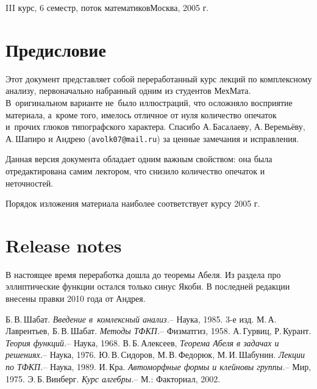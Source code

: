 \documentclass[a4paper]{article}
\begin{document}
{III курс, 6 семестр, поток математиков}{Москва, 2005 г.}

\pagebreak
\tableofcontents

\pagebreak

\section*{Предисловие}

Этот документ представляет собой переработанный курс лекций по комплексному анализу, первоначально набранный
одним из студентов МехМата. В~оригинальном варианте не~было иллюстраций, что осложняло восприятие материала,
а~кроме того, имелось отличное от нуля количество опечаток и~прочих глюков типографского характера. Спасибо
А.\,Басалаеву, А.\,Веремьёву, А.\,Шапиро и Андрею (\texttt{avolk07@mail.ru}) за ценные замечания и исправления.

Данная версия документа обладает одним важным свойством: она была отредактирована самим лектором, что снизило количество опечаток и неточностей.

Порядок изложения материала наиболее соответствует курсу 2005 г.

\section*{Release notes}

В настоящее время переработка дошла до теоремы Абеля.
Из раздела про эллиптические функции остался только синус Якоби.
В последней редакции внесены правки 2010 года от Андрея.

\medskip
\dmvntrail


\begin{thebibliography}{4}
\setlength\itemsep{-.5mm}
Б.\,В.\,Шабат. \emph{Введение в~комлексный анализ.}-- Наука, 1985. 3-е изд.
 М.\,А.\,Лаврентьев, Б.\,В.\,Шабат. \emph{Методы ТФКП.}-- Физматгиз, 1958.
 А.\,Гурвиц, Р.\,Курант. \emph{Теория функций.}-- Наука, 1968.
 В.\,Б.\,Алексеев, \emph{Теорема Абеля в задачах и решениях.}-- Наука, 1976.
 Ю.\,В.\,Сидоров, М.\,В.\,Федорюк, М.\,И.\,Шабунин. \emph{Лекции по ТФКП.}-- Наука, 1989.
 И.\,Кра. \emph{Автоморфные формы и клейновы группы.}-- Мир, 1975.
 Э.\,Б.\,Винберг. \emph{Курс алгебры.}-- М.: Факториал, 2002.
\end{thebibliography}
\end{document}
